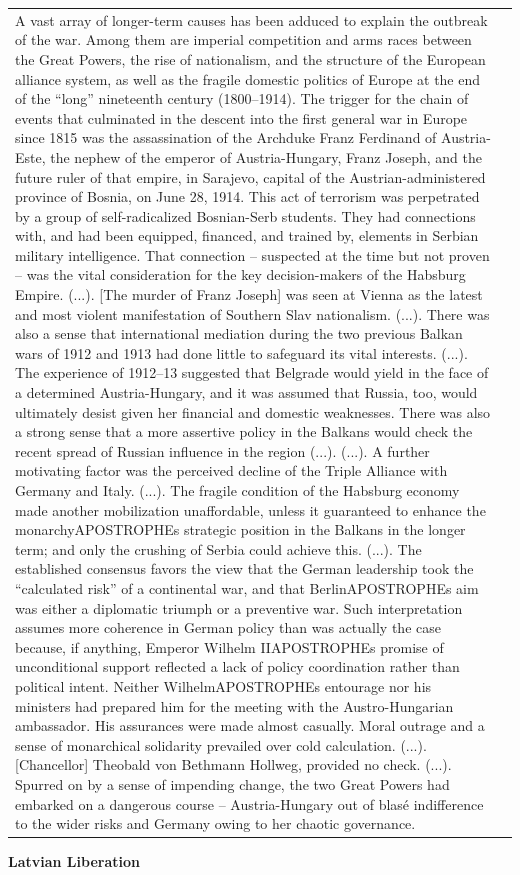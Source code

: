 {\begin{longtable}{p{}p{}}
A vast array of longer-term causes has been adduced to explain the outbreak of the war. Among them are imperial competition and arms races between the Great Powers, the rise of nationalism, and the structure of the European alliance system, as well as the fragile domestic politics of Europe at the end of the “long” nineteenth century (1800–1914). The trigger for the chain of events that culminated in the descent into the first general war in Europe since 1815 was the assassination of the Archduke Franz Ferdinand of Austria-Este, the nephew of the emperor of Austria-Hungary, Franz Joseph, and the future ruler of that empire, in Sarajevo, capital of the Austrian-administered province of Bosnia, on June 28, 1914. This act of terrorism was perpetrated by a group of self-radicalized Bosnian-Serb students. They had connections with, and had been equipped, financed, and trained by, elements in Serbian military intelligence. That connection – suspected at the time but not proven – was the vital consideration for the key decision-makers of the Habsburg Empire. (...). [The murder of Franz Joseph] was seen at Vienna as the latest and most violent manifestation of Southern Slav nationalism. (...). There was also a sense that international mediation during the two previous Balkan wars of 1912 and 1913 had done little to safeguard its vital interests. (...). The experience of 1912–13 suggested that Belgrade would yield in the face of a determined Austria-Hungary, and it was assumed that Russia, too, would ultimately desist given her financial and domestic weaknesses. There was also a strong sense that a more assertive policy in the Balkans would check the recent spread of Russian influence in the region (...). (...). A further motivating factor was the perceived decline of the Triple Alliance with Germany and Italy. (...). The fragile condition of the Habsburg economy made another mobilization unaffordable, unless it guaranteed to enhance the monarchyAPOSTROPHEs strategic position in the Balkans in the longer term; and only the crushing of Serbia could achieve this. (...). The established consensus favors the view that the German leadership took the “calculated risk” of a continental war, and that BerlinAPOSTROPHEs aim was either a diplomatic triumph or a preventive war. Such interpretation assumes more coherence in German policy than was actually the case because, if anything, Emperor Wilhelm IIAPOSTROPHEs promise of unconditional support reflected a lack of policy coordination rather than political intent. Neither WilhelmAPOSTROPHEs entourage nor his ministers had prepared him for the meeting with the Austro-Hungarian ambassador. His assurances were made almost casually. Moral outrage and a sense of monarchical solidarity prevailed over cold calculation. (...). [Chancellor] Theobald von Bethmann Hollweg, provided no check. (...). Spurred on by a sense of impending change, the two Great Powers had embarked on a dangerous course – Austria-Hungary out of blasé indifference to the wider risks and Germany owing to her chaotic governance.
\\
\end{longtable}}
\clearpage
         \textbf{Latvian Liberation} 

